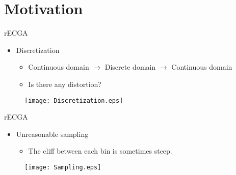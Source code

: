 \section{Motivation}

\begin{frame}{rECGA}
  \begin{itemize}
    \item Discretization 
      \begin{itemize}
        \item Continuous domain $\rightarrow$ Discrete domain $\rightarrow$
          Continuous domain
        \item Is there any distortion?
      \end{itemize}
  \end{itemize}
  \vspace*{24pt}
  \begin{figure}[htpb]
    \texttt{[image: Discretization.eps]}
  \end{figure}
\end{frame}

\begin{frame}{rECGA}
  \begin{itemize}
    \item Unreasonable sampling
      \begin{itemize}
        \item The cliff between each bin is sometimes steep.
      \end{itemize}
  \end{itemize}
  \begin{figure}[hpb]
    \centering
    \vfill\texttt{[image: Sampling.eps]}
  \end{figure}
\end{frame}

